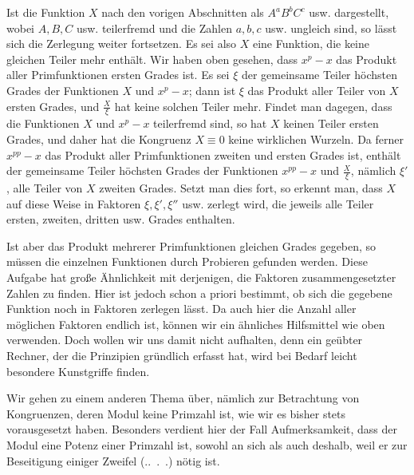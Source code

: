 Ist die Funktion $X$ nach den vorigen Abschnitten als $A^aB^bC^c$ usw. dargestellt, wobei $A,B,C$ usw. teilerfremd und die Zahlen $a,b,c$ usw. ungleich sind, so lässt sich die Zerlegung weiter fortsetzen. Es sei also $X$ eine Funktion, die keine gleichen Teiler mehr enthält. Wir haben oben gesehen, dass $x^p-x$ das Produkt aller Primfunktionen ersten Grades ist. Es sei $\xi$ der gemeinsame Teiler höchsten Grades der Funktionen $X$ und $x^p-x$; dann ist $\xi$ das Produkt aller Teiler von $X$ ersten Grades, und $\frac X\xi$ hat keine solchen Teiler mehr. Findet man dagegen, dass die Funktionen $X$ und $x^p-x$ teilerfremd sind, so hat $X$ keinen Teiler ersten Grades, und daher hat die Kongruenz $X\equiv0$ keine wirklichen Wurzeln. Da ferner $x^{pp}-x$ das Produkt aller Primfunktionen zweiten und ersten Grades ist, enthält der gemeinsame Teiler höchsten Grades der Funktionen $x^{pp}-x$ und $\frac X\xi$, nämlich $\xi'$, alle Teiler von $X$ zweiten Grades. Setzt man dies fort, so erkennt man, dass $X$ auf diese Weise in Faktoren $\xi,\xi',\xi''$ usw. zerlegt wird, die jeweils alle Teiler ersten, zweiten, dritten usw. Grades enthalten.

Ist aber das Produkt mehrerer Primfunktionen gleichen Grades gegeben, so müssen die einzelnen Funktionen durch Probieren gefunden werden. Diese Aufgabe hat große Ähnlichkeit mit derjenigen, die Faktoren zusammengesetzter Zahlen zu finden. Hier ist jedoch schon a priori bestimmt, ob sich die gegebene Funktion noch in Faktoren zerlegen lässt. Da auch hier die Anzahl aller möglichen Faktoren endlich ist, können wir ein ähnliches Hilfsmittel wie oben verwenden. Doch wollen wir uns damit nicht aufhalten, denn ein geübter Rechner, der die Prinzipien gründlich erfasst hat, wird bei Bedarf leicht besondere Kunstgriffe finden.

Wir gehen zu einem anderen Thema über, nämlich zur Betrachtung von Kongruenzen, deren Modul keine Primzahl ist, wie wir es bisher stets vorausgesetzt haben. Besonders verdient hier der Fall Aufmerksamkeit, dass der Modul eine Potenz einer Primzahl ist, sowohl an sich als auch deshalb, weil er zur Beseitigung einiger Zweifel (\textsection.\textsection.\ .\ .) nötig ist.
